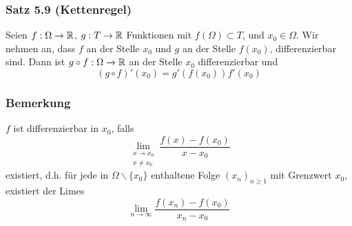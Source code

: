 \subsubsection*{Satz 5.9 (Kettenregel)}
Seien $f:\Omega\to\mathbb{R}$, $g:T\to\mathbb{R}$ Funktionen mit $f\left( \Omega\right)\subset T$, und $x_0\in\Omega$. Wir nehmen an, dass $f$ an der Stelle $x_0$ und $g$ an der Stelle $f\left( x_0\right)$, differenzierbar sind. Dann ist $g\circ f:\Omega\to\mathbb{R}$ an der Stelle $x_0$ differenzierbar und
\[\left( {g\circ f} \right)'\left( {{x_0}} \right) = g'\left( {f\left( {{x_0}} \right)} \right)f'\left( {{x_0}} \right)\]

\subsubsection*{Bemerkung}
$f$ ist differenzierbar in $x_0$, falls
\[\mathop {\lim }\limits_{\begin{array}{*{20}{c}}
{x \to {x_0}}\\
{x\not  = {x_0}}
\end{array}} \frac{{f\left( x \right) - f\left( {{x_0}} \right)}}{{x - {x_0}}}\]
existiert, d.h. für jede in $\Omega\backslash\{ x_0\}$ enthaltene Folge $\left( x_n\right)_{n\geq 1}$ mit Grenzwert $x_0$, existiert der Limes
\[\mathop {\lim }\limits_{n \to \infty } \frac{{f\left( {{x_n}} \right) - f\left( {{x_0}} \right)}}{{{x_n} - {x_0}}}\]

